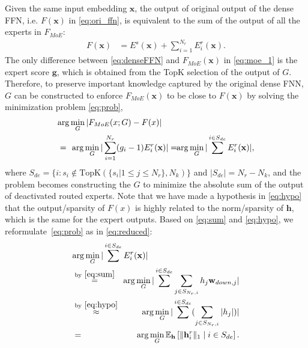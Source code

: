 Given the same input embedding $\mathbf{x}$, the output of original output of the dense FFN, i.e. $F(\mathbf{x})$ in \eqref{eq:ori_ffn}, is equivalent to the sum of the output of all the experts in $F_{MoE}$:
\begin{align}\label{eq:denseFFN}
    F(\mathbf{x}) &= E^s(\mathbf{x}) + \sum^{N_r}_{i=1} E_i^{r}(\textbf{x}). 
\end{align}
The only difference between \eqref{eq:denseFFN} and $F_{MoE}(\mathbf{x})$ in \eqref{eq:moe_1} is the expert score $\mathbf{g}$, which is obtained from the TopK selection of the output of $G$.
Therefore, to preserve important knowledge captured by the original dense FNN,
$G$ can be constructed to enforce $F_{MoE}(\mathbf{x})$ to be close to $F(\mathbf{x})$ by solving the minimization problem \eqref{eq:prob}, 
\begin{eqnarray}
\label{eq:prob}
    \lefteqn{\arg\min_{G} | F_{MoE}(x; G) - F(x)|} \nonumber \\
    & = \!&\! \arg\min_{G} | \sum^{N_r}_{i=1} (g_i-1) E_i^{r}(\textbf{x})| 
    = \! \! \arg\min_{G} |\sum^{i \in S_{de}} E_i^r(\mathbf{x}) |, \nonumber
\end{eqnarray}
where $S_{de} \!=\! \{i: s_i \!\notin\! \text{TopK}(\{s_i | 1 \!\leq\! j \!\leq\! N_r\}, N_k)\}$ and $|S_{de}| \!=\! N_r \!-\! N_k$, and the problem becomes constructing the $G$ to minimize the absolute sum of the output of deactivated routed experts.
Note that we have made a hypothesis in \eqref{eq:hypo} that the output/sparsity of $F(x)$ is highly related to the norm/sparsity of $\mathbf{h}$, which is the same for the expert outputs.
Based on \eqref{eq:sum} and \eqref{eq:hypo}, we reformulate~\eqref{eq:prob} as in \eqref{eq:reduced}:
\begin{eqnarray}
\label{eq:reduced}
    \lefteqn{\arg\min_{G} |\sum^{i \in S_{de}} E_i^r(\mathbf{x}) |} \nonumber \\
     & \overset{\text{by}\ \eqref{eq:sum}}{=} \!&\! \arg\min_{G} |\sum^{i \in S_{de}} \sum_{j\in S_{N_r,i}} h_j \mathbf{w}_{down,j} | \nonumber \\
     & \overset{\text{by}\ \eqref{eq:hypo}}{\approx} \!&\! \arg\min_{G} | \sum^{i \in S_{de}} (\sum_{j\in S_{N_r,i}} |h_j|) | \nonumber \\
     & = \!&\! \arg\min_{G} \mathbb{E}_{\mathbf{h}}\left[ \| \mathbf{h}^r_i \|_1 \mid i \in S_{de} \right].
\end{eqnarray}
